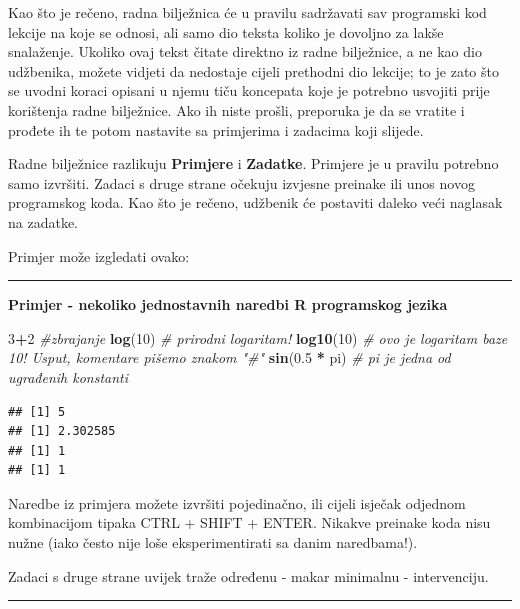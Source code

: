 \documentclass[]{book}
\newenvironment{Shaded}{\begin{snugshade}}{\end{snugshade}}
\newcommand{\KeywordTok}[1]{\textcolor[rgb]{0.13,0.29,0.53}{\textbf{#1}}}
\newcommand{\DecValTok}[1]{\textcolor[rgb]{0.00,0.00,0.81}{#1}}
\newcommand{\FloatTok}[1]{\textcolor[rgb]{0.00,0.00,0.81}{#1}}
\newcommand{\StringTok}[1]{\textcolor[rgb]{0.31,0.60,0.02}{#1}}
\newcommand{\CommentTok}[1]{\textcolor[rgb]{0.56,0.35,0.01}{\textit{#1}}}
\newcommand{\OperatorTok}[1]{\textcolor[rgb]{0.81,0.36,0.00}{\textbf{#1}}}
\newcommand{\NormalTok}[1]{#1}
\theoremstyle{definition}
\theoremstyle{definition}
\theoremstyle{definition}
\theoremstyle{remark}
\begin{document}
Kao što je rečeno, radna bilježnica će u pravilu sadržavati sav
programski kod lekcije na koje se odnosi, ali samo dio teksta koliko je
dovoljno za lakše snalaženje. Ukoliko ovaj tekst čitate direktno iz
radne bilježnice, a ne kao dio udžbenika, možete vidjeti da nedostaje
cijeli prethodni dio lekcije; to je zato što se uvodni koraci opisani u
njemu tiču koncepata koje je potrebno usvojiti prije korištenja radne
bilježnice. Ako ih niste prošli, preporuka je da se vratite i prođete ih
te potom nastavite sa primjerima i zadacima koji slijede.

Radne bilježnice razlikuju \textbf{Primjere} i \textbf{Zadatke}.
Primjere je u pravilu potrebno samo izvršiti. Zadaci s druge strane
očekuju izvjesne preinake ili unos novog programskog koda. Kao što je
rečeno, udžbenik će postaviti daleko veći naglasak na zadatke.

Primjer može izgledati ovako:

\begin{center}\rule{0.5\linewidth}{\linethickness}\end{center}

\textbf{Primjer - nekoliko jednostavnih naredbi R programskog jezika}

\begin{Shaded}
\begin{Highlighting}[]
\DecValTok{3}\OperatorTok{+}\DecValTok{2}         \CommentTok{#zbrajanje}
\KeywordTok{log}\NormalTok{(}\DecValTok{10}\NormalTok{)    }\CommentTok{# prirodni logaritam!}
\KeywordTok{log10}\NormalTok{(}\DecValTok{10}\NormalTok{)   }\CommentTok{# ovo je logaritam baze 10! Usput, komentare pišemo znakom "#"}
\KeywordTok{sin}\NormalTok{(}\FloatTok{0.5} \OperatorTok{*}\StringTok{ }\NormalTok{pi)      }\CommentTok{# pi je jedna od ugrađenih konstanti}
\end{Highlighting}
\end{Shaded}

\begin{verbatim}
## [1] 5
## [1] 2.302585
## [1] 1
## [1] 1
\end{verbatim}

Naredbe iz primjera možete izvršiti pojedinačno, ili cijeli isječak
odjednom kombinacijom tipaka CTRL + SHIFT + ENTER. Nikakve preinake koda
nisu nužne (iako često nije loše eksperimentirati sa danim naredbama!).

Zadaci s druge strane uvijek traže određenu - makar minimalnu -
intervenciju.

\begin{center}\rule{0.5\linewidth}{\linethickness}\end{center}
\end{document}
